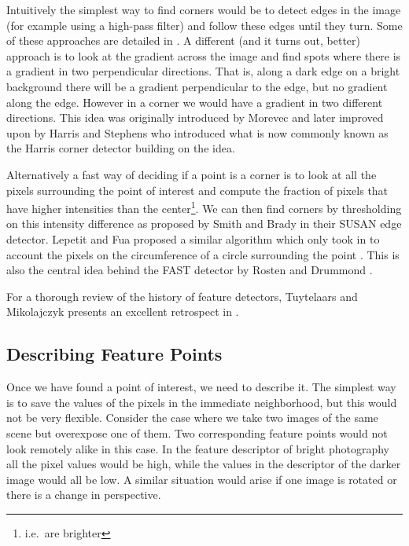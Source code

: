 Intuitively the simplest way to find corners would be to detect edges in 
the image (for example using a high-pass filter) and follow these edges 
until they turn. Some of these approaches are detailed in 
\cite{university1978comparison}. A different (and it turns out, better) 
approach is to look at the gradient across the image and find spots 
where there is a gradient in two perpendicular directions.  That is, 
along a dark edge on a bright background there will be a gradient 
perpendicular to the edge, but no gradient along the edge.  However in a 
corner we would have a gradient in two different directions. This idea 
was originally introduced by Morevec \cite{hans1977towards} and later 
improved upon by Harris and Stephens who introduced what is now commonly 
known as the Harris corner detector \cite{harris1988combined} building 
on the idea.

Alternatively a fast way of deciding if a point is a corner is to look 
at all the pixels surrounding the point of interest and compute the 
fraction of pixels that have higher intensities than the 
center\footnote{i.e.\ are brighter}. We can then find corners by 
thresholding on this intensity difference as proposed by Smith and Brady 
\cite{smith1997susan} in their SUSAN edge detector. Lepetit and Fua 
proposed a similar algorithm which only took in to account the pixels on 
the circumference of a circle surrounding the point 
\cite{lepetit2006keypoint}. This is also the central idea behind the 
FAST detector by Rosten and Drummond \cite{rosten2006machine}.

For a thorough review of the history of feature detectors, Tuytelaars 
and Mikolajczyk presents an excellent retrospect in 
\cite{tuytelaars2008local}.

\subsection{Describing Feature Points}

Once we have found a point of interest, we need to describe it. The 
simplest way is to save the values of the pixels in the immediate 
neighborhood, but this would not be very flexible. Consider the case 
where we take two images of the same scene but overexpose one of them.  
Two corresponding feature points would not look remotely alike in this 
case.
In the feature descriptor of bright photography all the pixel values 
would be high, while the values in the descriptor of the darker image 
would all be low. A similar situation would arise if one image is 
rotated or there is a change in perspective.

